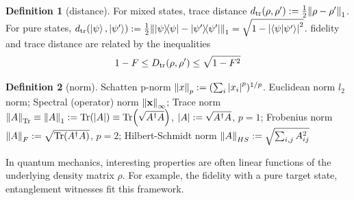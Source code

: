 \documentclass[
10pt,
aps,
pra,
linenumbers,
floatfix,
]{revtex4-2}
\theoremstyle{plain}
\theoremstyle{definition}
\newtheorem{definition}{Definition}
\newtheorem{problem}{Problem}
\newcommand{\dm}{\rho}
\begin{document}
\begin{definition}[distance]\label{def:distance}
	For mixed states, trace distance $d_{\tr}(\dm,\dm') : = \frac{1}{2} \norm{\dm-\dm'}_1$.
	For pure states, $d_{\tr}(\ket{\psi},\ket{\psi'}) : = \frac{1}{2}\norm{\op{\psi} -\op{\psi'}}_1 = \sqrt{1-\abs{\ip{\psi}{\psi'}}^2}$.
	fidelity and trace distance are related by the inequalities
	\begin{equation}
		1-F\le D_{\tr}(\dm,\dm') \le \sqrt{1-F^2}
	\end{equation}
\end{definition}
\begin{definition}[norm]\label{def:norm}
	Schatten p-norm $\norm{x}_p:= (\sum_i \abs{x_i}^p)^{1/p}$.
	Euclidean norm $l_2$ norm;
	Spectral (operator) norm $\norm{\vb{x}}_{\infty}$;
	Trace norm $\norm{A}_{\Tr}\equiv\norm{A}_{1}:=\Tr(\abs{A})\equiv\Tr(\sqrt{A^\dagger A})$, $\abs{A}:=\sqrt{A^\dagger A}$, $p=1$;
	Frobenius norm $\norm{A}_{F}:=\sqrt{\Tr(A^\dagger A)}$, $p=2$;
	Hilbert-Schmidt norm $\norm{A}_{HS}:=\sqrt{\sum_{i,j} A_{ij}^2 }$
\end{definition}
In quantum mechanics, interesting properties are often linear functions of the underlying density matrix $\dm$.
For example, the fidelity with a pure target state, entanglement witnesses fit this framework.
\end{document}

